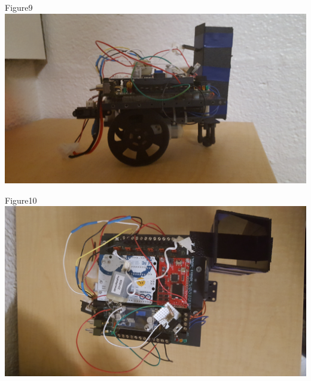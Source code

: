 \documentclass{article}
\begin{document}
\begin{center}{Figure9 \includegraphics[width=\textwidth]{RobotSide.jpg}}\end{center}
\begin{center}{Figure10 \includegraphics[width=\textwidth]{RobotTop.jpg}}\end{center}

\newpage
\end{document}
